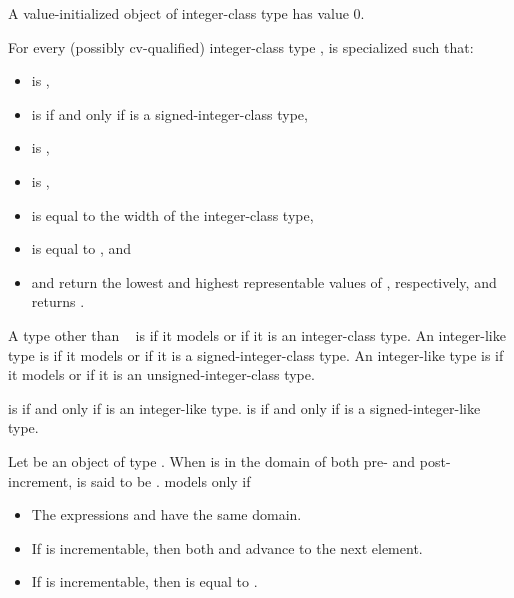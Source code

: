 \pnum
A value-initialized object of integer-class type has value 0.

\pnum
For every (possibly cv-qualified) integer-class type ,
 is specialized such that:
\begin{itemize}
\item
   is ,
\item
   is 
  if and only if  is a signed-integer-class type,
\item
   is ,
\item
   is ,
\item
   is equal to the width of the integer-class type,
\item
   is equal to , and
\item
   and  return
  the lowest and highest representable values of , respectively, and
   returns .
\end{itemize}

\pnum
A type  other than \cv{}~ is 
if it models  or
if it is an integer-class type.
An integer-like type  is 
if it models  or
if it is a signed-integer-class type.
An integer-like type  is 
if it models  or
if it is an unsigned-integer-class type.

\pnum
{} is 
if and only if  is an integer-like type.
 is 
if and only if  is a signed-integer-like type.

\pnum
Let  be an object of type . When  is in the domain of
both pre- and post-increment,  is said to be .
 models  only if
\begin{itemize}
\item The expressions  and  have the same domain.
\item If  is incrementable, then both 
  and  advance  to the next element.
\item If  is incrementable, then
   is equal to
  .
\end{itemize}

